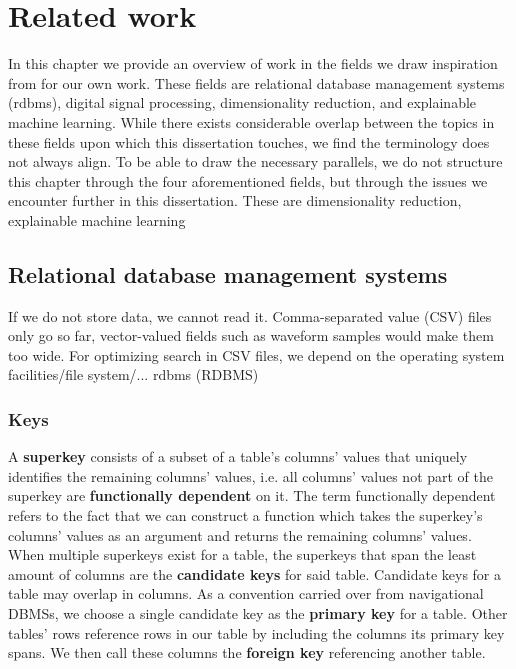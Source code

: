 \chapter{Related work}

In this chapter we provide an overview of work in the fields we draw inspiration from for our own work.
These fields are relational database management systems (\gls{rdbms}), digital signal processing, dimensionality reduction, and explainable machine learning.
While there exists considerable overlap between the topics in these fields upon which this dissertation touches, we find the terminology does not always align.
To be able to draw the necessary parallels, we do not structure this chapter through the four aforementioned fields, but through the issues we encounter further in this dissertation.
These are dimensionality reduction, explainable machine learning

\section{Relational database management systems}

If we do not store data, we cannot read it.
Comma-separated value (CSV) files only go so far, vector-valued fields such as waveform samples would make them too wide.
For optimizing search in CSV files, we depend on the operating system facilities/file system/...
\Acrlong{rdbms} (RDBMS)

\subsection{Keys}%

A \textbf{superkey} consists of a subset of a table's columns' values that uniquely identifies the remaining columns' values, i.e. all columns' values not part of the superkey are \textbf{functionally dependent} on it.
The term functionally dependent refers to the fact that we can construct a function which takes the superkey's columns' values as an argument and returns the remaining columns' values.
When multiple superkeys exist for a table, the superkeys that span the least amount of columns are the \textbf{candidate keys} for said table.
Candidate keys for a table may overlap in columns.
As a convention carried over from navigational DBMSs, we choose a single candidate key as the \textbf{primary key} for a table.
Other tables' rows reference rows in our table by including the columns its primary key spans.
We then call these columns the \textbf{foreign key} referencing another table.

